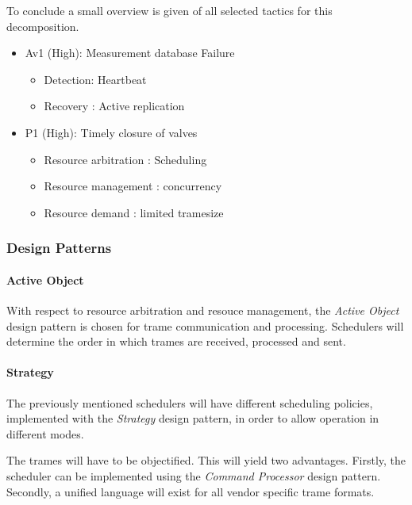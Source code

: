\npar To conclude a small overview is given of all selected tactics for this
decomposition.

\begin{itemize}
 	\item Av1 (High): Measurement database Failure
 	\begin{itemize}
 		\item Detection: Heartbeat 
 		\item Recovery : Active replication
 	\end{itemize}
  	\item P1 (High): Timely closure of valves
  	\begin{itemize}
  		\item Resource arbitration : Scheduling
		\item Resource management  : concurrency
		\item Resource demand      : limited tramesize
  	\end{itemize}
\end{itemize}

\subsubsection{Design Patterns}
\label{add:it1/patterns}

\paragraph{Active Object}

\npar With respect to resource arbitration and resouce management, the
\emph{Active Object} design pattern is chosen for trame communication and
processing. Schedulers will determine the order in which trames are received,
processed and sent. 

\paragraph{Strategy}

\npar The previously mentioned schedulers will have different scheduling
policies, implemented with the \emph{Strategy} design pattern, in order to
allow operation in different modes.

\npar The trames will have to be objectified. This will yield two advantages.
Firstly, the scheduler can be implemented using the \emph{Command Processor}
design pattern. Secondly, a unified language will exist for all vendor
specific trame formats.

